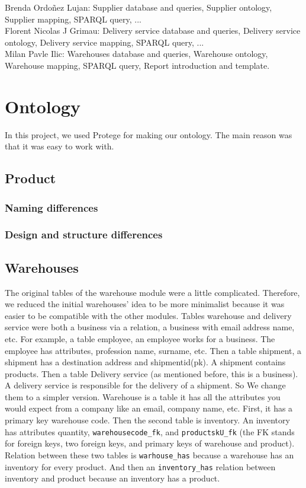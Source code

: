 \documentclass{article}
\begin{document}
\noindent Brenda Ordoñez Lujan: Supplier database and queries, Supplier ontology, Supplier mapping, SPARQL query, ...
\\

\noindent Florent Nicolas J Grimau: Delivery service database and queries, Delivery service ontology, Delivery service mapping, SPARQL query, ...
\\

\noindent Milan Pavle Ilic: Warehouses database and queries, Warehouse ontology, Warehouse mapping, SPARQL query, Report introduction and template.



\section{Ontology}
In this project, we used Protege for making our ontology. The main reason was that it was easy to work with.


\subsection{Product}
\subsubsection{Naming differences}
\subsubsection{Design and structure differences}



\subsection{Warehouses}
The original tables of the warehouse module were a little complicated. Therefore, we reduced the initial warehouses' idea to be more minimalist because it was easier to be compatible with the other modules. Tables warehouse and delivery service were both a business via a relation, a business with email address name, etc. For example, a table employee, an employee works for a business. The employee has attributes, profession name, surname, etc. Then a table shipment, a shipment has a destination address and shipmentid(pk). A shipment contains products. Then a table Delivery service (as mentioned before, this is a business). A delivery service is responsible for the delivery of a shipment. So We change them to a simpler version. Warehouse is a table it has all the attributes you would expect from a company like an email, company name, etc. First, it has a primary key warehouse code. Then the second table is inventory. An inventory has attributes quantity, \texttt{warehousecode\_fk}, and \texttt{productskU\_fk} (the FK stands for foreign keys, two foreign keys, and primary keys of warehouse and product). Relation between these two tables is \texttt{warhouse\_has} because a warehouse has an inventory for every product. And then an \texttt{inventory\_has} relation between inventory and product because an inventory has a product.
\end{document}
